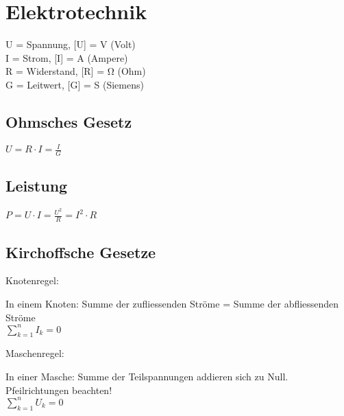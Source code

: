 \section{Elektrotechnik}

	\begin{symbolbox}
		U = Spannung, [U] = V (Volt)\\
		I = Strom, [I] = A (Ampere)\\
		R = Widerstand, [R] = Ω (Ohm)\\
		G = Leitwert, [G] = S (Siemens)
	\end{symbolbox}
	
\begin{sectionbox}
	\subsection{Ohmsches Gesetz}

	\begin{emphbox}
	$ U = R \cdot I = \frac{I}{G} $
	\end{emphbox}

	\subsection{Leistung}

	\begin{emphbox}
	$ P = U \cdot I = \frac{U^2}{R} = I^2 \cdot R $
	\end{emphbox}
	

		
\end{sectionbox}

\begin{sectionbox}
	\subsection{Kirchoffsche Gesetze}

	Knotenregel:
	\begin{emphbox}
		In einem Knoten: Summe der zufliessenden Ströme = Summe der abfliessenden Ströme\\
		$\sum _{k=1}^{n}I_k = 0$
	\end{emphbox}
	
	Maschenregel:
	\begin{emphbox}
		In einer Masche: Summe der Teilspannungen addieren sich zu Null. Pfeilrichtungen beachten!\\
		$\sum _{k=1}^{n}U_k = 0$
	\end{emphbox}

\end{sectionbox}


